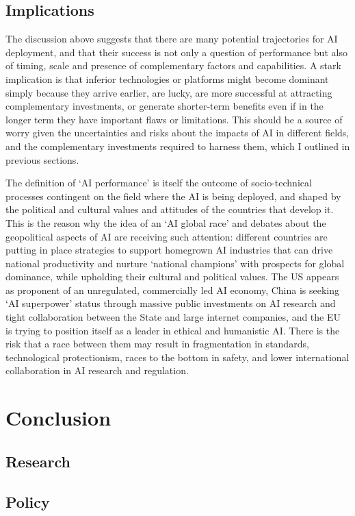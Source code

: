 \documentclass[11pt]{article}
\begin{document}
\subsection{Implications}
\label{subsec:races}
The discussion above suggests that there are many potential trajectories for AI deployment, and that their success is not only a question of performance but also of timing, scale and presence of complementary factors and capabilities. A stark implication is that inferior technologies or platforms might become dominant simply because they arrive earlier, are lucky, are more successful at attracting complementary investments, or generate shorter-term benefits even if in the longer term they have important flaws or limitations. This should be a source of worry given the uncertainties and risks about the impacts of AI in different fields, and the complementary investments required to harness them, which I outlined in previous sections.

The definition of `AI performance' is itself the outcome of socio-technical processes contingent on the field where the AI is being deployed, and shaped by the political and cultural values and attitudes of the countries that develop it. This is the reason why the idea of an `AI global race' and debates about the geopolitical aspects of AI are receiving such attention: different countries are putting in place strategies to support homegrown AI industries that can drive national productivity and nurture `national champions' with prospects for global dominance, while upholding their cultural and political values. The US appears as proponent of an unregulated, commercially led AI economy, China is seeking `AI superpower' status through massive public investments on AI research and tight collaboration between the State and large internet companies, and the EU is trying to position itself as a leader in ethical and humanistic AI. There is the risk that a race between them may result in fragmentation in standards, technological protectionism, races to the bottom in safety, and lower international collaboration in AI research and regulation. 

\section{Conclusion}
\label{sec:conclusion}

\subsection{Research}
\label{subsec:research}

\subsection{Policy}
\label{subsec:policy}
\subsection{}







\singlespacing
\setlength\bibsep{0pt}


\end{document}
